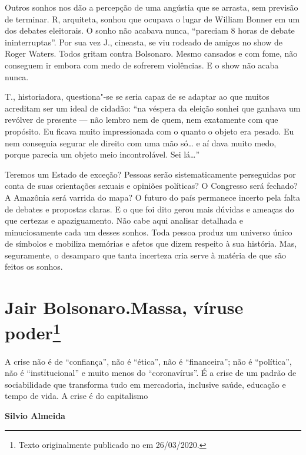 Outros sonhos nos dão a percepção de uma angústia que se arrasta, sem
previsão de terminar. R, arquiteta, sonhou que ocupava o lugar de William
Bonner em um dos debates eleitorais. O sonho não acabava nunca,
``pareciam 8 horas de debate ininterruptas''. Por sua vez J., cineasta,
se viu rodeado de amigos no show de Roger Waters. Todos gritam contra
Bolsonaro. Mesmo cansados e com fome, não conseguem ir embora com medo
de sofrerem violências. E o show não acaba nunca.

T., historiadora, questiona"-se se seria capaz de se adaptar ao que
muitos acreditam ser um ideal de cidadão: ``na véspera da eleição sonhei
que ganhava um revólver de presente --- não lembro nem de quem, nem
exatamente com que propósito. Eu ficava muito impressionada com o
quanto o objeto era pesado. Eu nem conseguia segurar ele direito com uma
mão só\ldots{} e aí dava muito medo, porque parecia um objeto meio
incontrolável. Sei lá\ldots{}''

\asterisc

Teremos um Estado de exceção? Pessoas serão sistematicamente perseguidas
por conta de suas orientações sexuais e opiniões políticas? O Congresso
será fechado? A Amazônia será varrida do mapa? O futuro do país
permanece incerto pela falta de debates e propostas claras. E o que foi
dito gerou mais dúvidas e ameaças do que certezas e apaziguamento. Não
cabe aqui analisar detalhada e minuciosamente cada um desses sonhos.
Toda pessoa produz um universo único de símbolos e mobiliza memórias e
afetos que dizem respeito à sua história. Mas, seguramente, o desamparo
que tanta incerteza cria serve à matéria de que são feitos os sonhos.

\chapter*{Jair Bolsonaro.\vspace{-.15cm}\break Massa, vírus\vspace{-.15cm}\break e poder\footnote{Texto originalmente publicado no {} em 26/03/2020.}} %

\epigraph{\Formular\scriptsize{A crise não é de “confiança”, não é “ética”, não é “financeira”; não é
“política”, não é “institucional” e muito menos do “coronavírus”. É a
crise de um padrão de sociabilidade que transforma tudo em mercadoria,
inclusive saúde, educação e tempo de vida. A crise é do capitalismo}}{\Formular\scriptsize\textbf{Silvio Almeida}}

